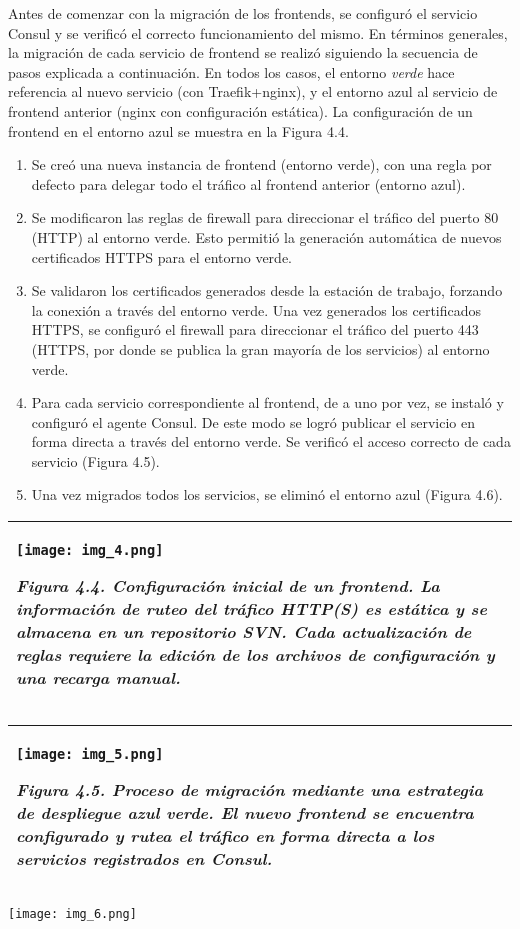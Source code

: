 Antes de comenzar con la migración de los frontends, se configuró el servicio Consul y se verificó el correcto funcionamiento del mismo. En términos generales, la migración de cada servicio de frontend se realizó siguiendo la secuencia de pasos explicada a continuación. En todos los casos, el entorno \textit{verde} hace referencia al nuevo servicio (con Traefik+nginx), y el entorno azul al servicio de frontend anterior (nginx con configuración estática). La configuración de un frontend en el entorno azul se muestra en la Figura 4.4.

\begin{enumerate}
\item Se creó una nueva instancia de frontend (entorno verde), con una regla por defecto para delegar todo el tráfico al frontend anterior (entorno azul).
\item Se modificaron las reglas de firewall para direccionar el tráfico del puerto 80 (HTTP) al entorno verde. Esto permitió la generación automática de nuevos certificados HTTPS para el entorno verde.
\item Se validaron los certificados generados desde la estación de trabajo, forzando la conexión a través del entorno verde. Una vez generados los certificados HTTPS, se configuró el firewall para direccionar el tráfico del puerto 443 (HTTPS, por donde se publica la gran mayoría de los servicios) al entorno verde.
\item Para cada servicio correspondiente al frontend, de a uno por vez, se instaló y configuró el agente Consul. De este modo se logró publicar el servicio en forma directa a través del entorno verde. Se verificó el acceso correcto de cada servicio (Figura 4.5).
\item Una vez migrados todos los servicios, se eliminó el entorno azul (Figura 4.6).
\end{enumerate}
\begin{tabular}{|l|}
\hline
\texttt{[image: img\_4.png]}


\textit{Figura 4.4. Configuración inicial de un frontend. La información de ruteo del tráfico HTTP(S) es estática y se almacena en un repositorio SVN. Cada actualización de reglas requiere la edición de los archivos de configuración y una recarga manual.} \\ \hline
\end{tabular}
\begin{tabular}{|l|}
\hline
\texttt{[image: img\_5.png]}


\textit{Figura 4.5. Proceso de migración mediante una estrategia de despliegue azul verde. El nuevo frontend se encuentra configurado y rutea el tráfico en forma directa a los servicios registrados en Consul.} \\ \hline
\end{tabular}
\texttt{[image: img\_6.png]}


